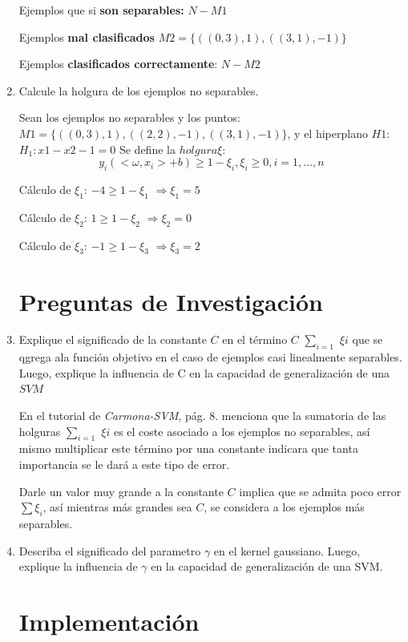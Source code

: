 \documentclass{article}
\begin{document}
\begin{enumerate}
    Ejemplos que si \textbf{son separables: } $N - M1$

    Ejemplos \textbf{mal clasificados} $M2 = \{((0, 3), 1),((3,1),-1)\}$

    Ejemplos \textbf{clasificados correctamente}: $N - M2$
    

    \item Calcule la holgura de los ejemplos no separables.

    Sean los ejemplos no separables y los puntos: $M1 = \{((0, 3), 1), ((2,2),-1), ((3,1),-1)\}$, y el hiperplano $H1$: $H_1: x1 - x2 - 1 = 0$
    Se define la $holgura \xi$:
    \[
        y_i(<\omega, x_i> + b) \geq 1 - \xi_i, \xi_i \geq 0, i = 1,\dots, n    
    \]

    Cálculo de $\xi_1$: $-4 \geq 1 - \xi_1$ $\Rightarrow \xi_1 = 5$

    Cálculo de $\xi_2$: $1 \geq 1 - \xi_2$ $\Rightarrow \xi_2 = 0$

    Cálculo de $\xi_3$: $-1 \geq 1 - \xi_3$ $\Rightarrow \xi_3 = 2$ 


    \section{Preguntas de Investigación}

    \item  Explique el significado de la constante $C$ en el término $C$ $\sum_{i=1}$ $\xi i$ que se qgrega ala función objetivo
    en el caso de ejemplos casi linealmente separables. Luego, explique la influencia de C en la capacidad de generalización de una $SVM$
    
    En el tutorial de \textit{Carmona-SVM}, pág. 8. menciona que la sumatoria de las holguras $\sum_{i=1}$ $\xi i$ es el coste asociado
    a los ejemplos no separables, así mismo multiplicar este término por una constante indicara que tanta importancia se le dará a este tipo de error.

    Darle un valor muy grande a la constante $C$ implica que se admita poco error $\sum \xi_i$, así mientras más grandes sea $C$, se considera a los ejemplos
    más separables.

    \item Describa el significado del parametro $\gamma$ en el kernel gaussiano. Luego, explique la influencia de $\gamma$ en la
    capacidad de generalización de una SVM.

    \section{Implementación}


\end{enumerate}
\end{document}
